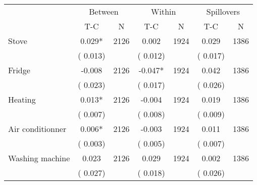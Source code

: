 
\begin{tabular}{l*{6}{c}}\hline&\multicolumn{2}{c}{Between}&\multicolumn{2}{c}{Within}&\multicolumn{2}{c}{Spillovers} \\ \cmidrule(r){2-3}\cmidrule(l){4-5}\cmidrule(l){6-7} & {T-C} & {N} & {T-C} & {N}  & {T-C}  & {N}  \\ \midrule
Stove        &              0.029*      &       2126       &              0.002      &       1924       &              0.029      &       1386       \\
                       &       (       0.013)            &                               &       (       0.012)            &                               &       (       0.017)            &                               \\
Fridge        &             -0.008      &       2126       &             -0.047*      &       1924       &              0.042      &       1386       \\
                       &       (       0.023)            &                               &       (       0.017)            &                               &       (       0.026)            &                               \\
Heating        &              0.013*      &       2126       &             -0.004      &       1924       &              0.019      &       1386       \\
                       &       (       0.007)            &                               &       (       0.008)            &                               &       (       0.009)            &                               \\
Air conditionner        &              0.006*      &       2126       &             -0.003      &       1924       &              0.011      &       1386       \\
                       &       (       0.003)            &                               &       (       0.005)            &                               &       (       0.007)            &                               \\
Washing machine        &              0.023      &       2126       &              0.029      &       1924       &              0.002      &       1386       \\
                       &       (       0.027)            &                               &       (       0.018)            &                               &       (       0.026)            &                               \\

\end{tabular}
